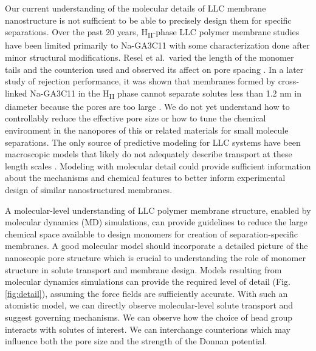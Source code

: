 \documentclass[journal=jpcbfk,manusciprt=article]{achemso}
\begin{document}
  Our current understanding of the molecular details of LLC membrane nanostructure
  is not sufficient to be able to precisely design them for specific separations. 
  Over the past 20 years, H\textsubscript{II}-phase LLC polymer membrane studies have
  been limited primarily to Na-GA3C11 with some characterization done after minor 
  structural modifications. Resel et al.~varied the length of the monomer tails and the
  counterion used and observed its affect on pore spacing \cite{resel_structural_2000}.
  In a later study of rejection performance, it was shown that membranes formed by cross-
  linked Na-GA3C11 in the H\textsubscript{II} phase cannot separate solutes less than 1.2 
  nm in diameter because the pores are too large \cite{zhou_supported_2005}. We do not
  yet understand how to controllably reduce the effective pore size or how to tune
  the chemical environment in the nanopores of this or related materials for
  small molecule separations. The only source of predictive modeling for LLC
  systems have been macroscopic models that likely do not adequately describe
  transport at these length scales \cite{hatakeyama_water_2011}. 
  Modeling with molecular detail could provide sufficient information about the mechanisms 
  and chemical features to better inform experimental design of similar nanostructured membranes. 

  A molecular-level understanding of LLC polymer membrane structure, enabled by
  molecular dynamics (MD) simulations, can provide guidelines to reduce the large
  chemical space available to design monomers for creation of separation-specific
  membranes. A good molecular model should incorporate a detailed picture of the
  nanoscopic pore structure which is crucial to understanding the role of
  monomer structure in solute transport and membrane design. Models resulting
  from molecular dynamics simulations can provide the required level of detail
  (Fig. \ref{fig:detail}), assuming the force fields are sufficiently accurate.
  With such an atomistic model, we can directly observe molecular-level solute
  transport and suggest governing mechanisms. We can observe how the choice of
  head group interacts with solutes of interest. We can interchange
  counterions which may influence both the pore size and the strength of the
  Donnan potential. 
\end{document}
